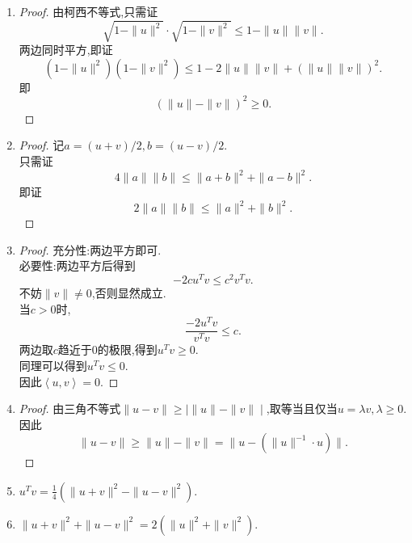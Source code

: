 \documentclass[11pt]{ctexart}
\theoremstyle{definition}
\numberwithin{equation}{section}
\begin{document}
\begin{aaa}
    \begin{enumerate}
        \item \begin{proof}
                由柯西不等式,只需证\[\sqrt{1-\|u\|^2}\cdot \sqrt{1-\|v\|^2}\leq 1-\|u\|\|v\|.\]
                两边同时平方,即证\[(1-\|u\|^2)(1-\|v\|^2)\leq 1-2\|u\|\|v\|+(\|u\|\|v\|)^2.\]
                即\[(\|u\|-\|v\|)^2\geq 0.\]
                \end{proof}
        \item \begin{proof}
                记$a=(u+v)/2,b=(u-v)/2$.\\
                只需证\[4\|a\|\|b\|\leq \|a+b\|^2+\|a-b\|^2.\]
                即证\[2\|a\|\|b\|\leq \|a\|^2+\|b\|^2.\]
                \end{proof}
        \item \begin{proof}
                充分性:两边平方即可.\\
                必要性:两边平方后得到\[-2cu^Tv\leq c^2v^Tv.\]
                不妨$\|v\|\neq 0$,否则显然成立.\\
                当$c>0$时,\[ \frac{-2u^Tv}{v^Tv}\leq c.\]
                两边取$c$趋近于0的极限,得到$u^Tv\geq 0.$\\
                同理可以得到$u^Tv\leq 0.$\\
                因此$\left\langle u,v\right\rangle =0.$
                \end{proof}
        \item \begin{proof}
                由三角不等式$\|u-v\|\geq \mid \|u\|-\|v\|\mid $,取等当且仅当$u=\lambda v,\lambda\geq0$.
                因此\[\|u-v\|\geq \|u\|-\|v\|=\|u-(\|u\|^{-1}\cdot u)\|.\]
                \end{proof}
        \item $u^Tv=\frac14(\|u+v\|^2-\|u-v\|^2).$
        \item $\|u+v\|^2+\|u-v\|^2=2(\|u\|^2+\|v\|^2).$
    \end{enumerate}
\end{aaa}
\end{document}
